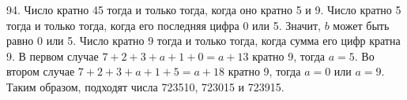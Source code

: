 94. Число кратно 45 тогда и только тогда, когда оно кратно 5 и 9. Число кратно 5 тогда и только тогда, когда его последняя цифра 0 или 5. Значит, $b$ может быть равно 0 или 5. Число кратно 9 тогда и только тогда, когда сумма его цифр кратна 9. В первом случае $7+2+3+a+1+0=a+13$ кратно 9, тогда $a=5.$ Во втором случае
$7+2+3+a+1+5=a+18$ кратно 9, тогда $a=0$ или $a=9.$ Таким образом, подходят числа 723510, 723015 и 723915.\\
